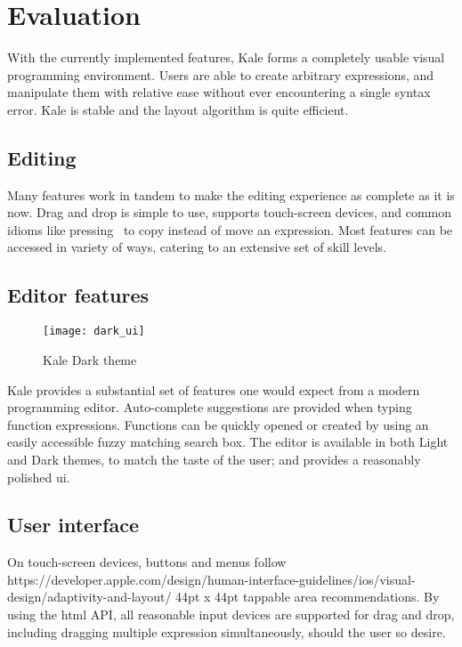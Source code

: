 \chapter{Evaluation}

With the currently implemented features, Kale forms a completely
usable visual programming environment. Users are able to create
arbitrary expressions, and manipulate them with relative ease without
ever encountering a single syntax error. Kale is stable and the layout
algorithm is quite efficient.

\section{Editing}
Many features work in tandem to make the editing experience as complete as it
is now. Drag and drop is simple to use, supports touch-screen devices, and
common idioms like pressing~\keys{\ctrl} to copy instead of move an expression.
Most features can be accessed in variety of ways, catering to an extensive
set of skill levels. %


\section{Editor features}
\begin{wrapfigure}[11]{r}{8cm}
\texttt{[image: dark\_ui]}	
\caption{Kale Dark theme}
\end{wrapfigure}

Kale provides a substantial set of features one would expect from a modern
programming editor. Auto-complete suggestions are provided when typing
function expressions. Functions can be quickly opened or created by using an
easily accessible fuzzy matching search box. The editor is available in both
Light and Dark themes, to match the taste of the user; and provides a
reasonably polished \ac{ui}.

\section{User interface}
On touch-screen devices, buttons and menus follow
{https://developer.apple.com/design/human-interface-guidelines/ios/visual-design/adaptivity-and-layout/}
44pt x 44pt tappable area recommendations. By using the \ac{html}
 API,
all reasonable input devices are supported for drag and drop, including dragging
multiple expression simultaneously, should the user so desire.

